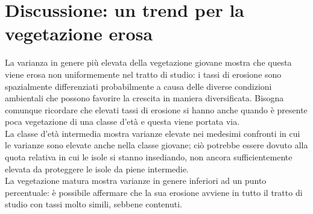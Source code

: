 \section{Discussione: un trend per la vegetazione erosa}
La varianza in genere più elevata della vegetazione giovane mostra che questa viene erosa non uniformemente nel tratto di studio: i tassi di erosione sono spazialmente differenziati probabilmente a causa delle diverse condizioni ambientali che possono favorire la crescita in maniera diversificata.
Bisogna comunque ricordare che elevati tassi di erosione si hanno anche quando è presente poca vegetazione di una classe d'età e questa viene portata via.
\\
La classe d'età intermedia mostra varianze elevate nei medesimi confronti in cui le varianze sono elevate anche nella classe giovane; ciò potrebbe essere dovuto alla quota relativa in cui le isole si stanno insediando, non ancora sufficientemente elevata da proteggere le isole da piene intermedie.
\\
La vegetazione matura mostra varianze in genere inferiori ad un punto percentuale: è possibile affermare che la sua erosione avviene in tutto il tratto di studio con tassi molto simili, sebbene contenuti.

